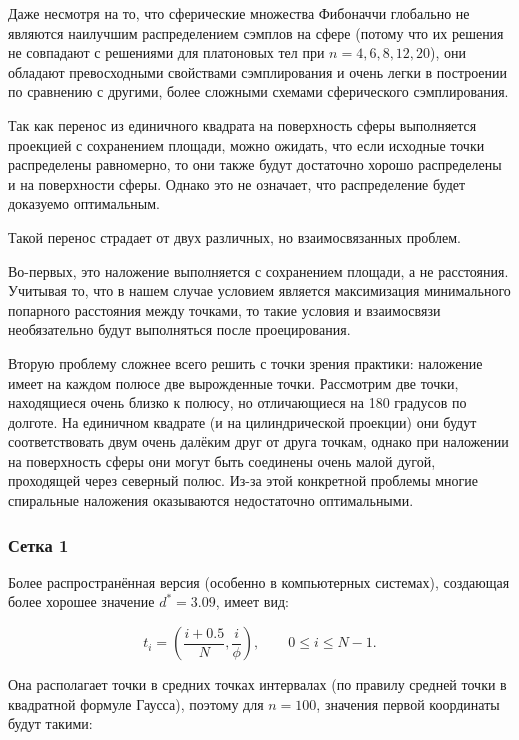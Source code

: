 \documentclass[12pt, a4paper]{article}
\begin{document}
Даже несмотря на то, что сферические множества Фибоначчи глобально не являются наилучшим распределением сэмплов на сфере (потому что их решения не совпадают с решениями для платоновых тел при $n=4,6,8,12,20$), они обладают превосходными свойствами сэмплирования и очень легки в построении по сравнению с другими, более сложными схемами сферического сэмплирования.

Так как перенос из единичного квадрата на поверхность сферы выполняется проекцией с сохранением площади, можно ожидать, что если исходные точки распределены равномерно, то они также будут достаточно хорошо распределены и на поверхности сферы. Однако это не означает, что распределение будет доказуемо оптимальным.

Такой перенос страдает от двух различных, но взаимосвязанных проблем.

Во-первых, это наложение выполняется с сохранением площади, а не расстояния. Учитывая то, что в нашем случае условием является максимизация минимального попарного расстояния между точками, то такие условия и взаимосвязи необязательно будут выполняться после проецирования.

Вторую проблему сложнее всего решить с точки зрения практики: наложение имеет на каждом полюсе две вырожденные точки. Рассмотрим две точки, находящиеся очень близко к полюсу, но отличающиеся на 180 градусов по долготе. На единичном квадрате (и на цилиндрической проекции) они будут соответствовать двум очень далёким друг от друга точкам, однако при наложении на поверхность сферы они могут быть соединены очень малой дугой, проходящей через северный полюс. Из-за этой конкретной проблемы многие спиральные наложения оказываются недостаточно оптимальными.

\subsubsection*{Сетка 1}

Более распространённая версия (особенно в компьютерных системах), создающая более хорошее значение $d^*=3.09$, имеет вид:

\begin{displaymath}
    t_i = \left( \frac{i + 0.5}{N}, \frac{i}{\phi} \right),
    \qquad
    0 \leq i \leq N-1.
    \tag{2}
\end{displaymath}

Она располагает точки в средних точках интервалах (по правилу средней точки в квадратной формуле Гаусса), поэтому для $n=100$, значения первой координаты будут такими:
\end{document}

